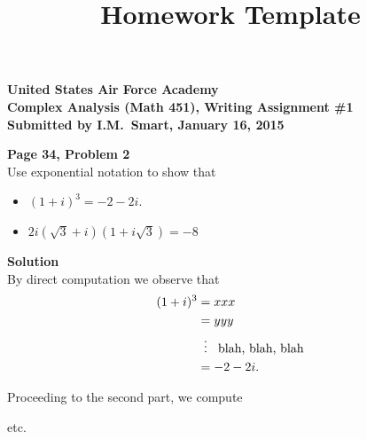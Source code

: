 \documentclass[letterpaper, 11pt]{article}
\begin{document}
\title{Homework Template}

\begin{center}
{
\large
\bf
United States Air Force Academy\\
Complex Analysis (Math 451), Writing Assignment \#1\\
Submitted by I.M.\ Smart, \; January 16, 2015
}
\end{center}

\bigskip

\textbf{Page 34, Problem 2}\\
Use exponential notation to show that
\begin{itemize}
\item $(1+i)^3 = -2-2i$.
\item $2i(\sqrt{3}+i)(1+i\sqrt{3})=-8$
\end{itemize}

\textbf{Solution}\\
By direct computation we observe that
\begin{align*}
(1+i)^3 &= xxx\\
		&= yyy\\
        & \vdotswithin{=} \text{ blah, blah, blah}\\
        &= -2-2i.
\end{align*}

Proceeding to the second part, we compute

etc.
\end{document}
